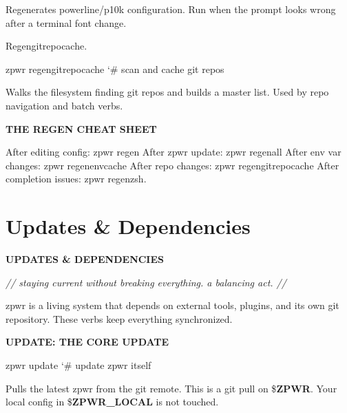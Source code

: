 \documentclass[11pt,a4paper,twoside]{book}
\begin{document}
Regenerates powerline/p10k configuration. Run when the prompt looks wrong after a terminal font change.

Regengitrepocache.

\begin{codebox}
\color{neongreen}zpwr regengitrepocache              {\char`\#} scan and cache git repos\\
\end{codebox}

Walks the filesystem finding git repos and builds a master list. Used by repo navigation and batch verbs.


\vspace{12pt}
{\bfseries\color{neonyellow} THE REGEN CHEAT SHEET}\vspace{4pt}

After editing config:     zpwr regen After zpwr update:        zpwr regenall After env var changes:    zpwr regenenvcache After repo changes:       zpwr regengitrepocache After completion issues:  zpwr regenzsh.


\vspace{16pt}

\section{Updates \& Dependencies}


\vspace{10pt}
{\large\bfseries\color{neoncyan} UPDATES \& DEPENDENCIES}\vspace{6pt}

{\small\itshape\color{dimtext} // staying current without breaking everything. a balancing act. //}

zpwr is a living system that depends on external tools, plugins, and its own git repository. These verbs keep everything synchronized.


\vspace{12pt}
{\bfseries\color{neonyellow} UPDATE: THE CORE UPDATE}\vspace{4pt}

\begin{codebox}
\color{neongreen}zpwr update                         {\char`\#} update zpwr itself\\
\end{codebox}

Pulls the latest zpwr from the git remote. This is a git pull on \$\textbf{ZPWR}. Your local config in \$\textbf{ZPWR\_LOCAL} is not touched.
\end{document}
